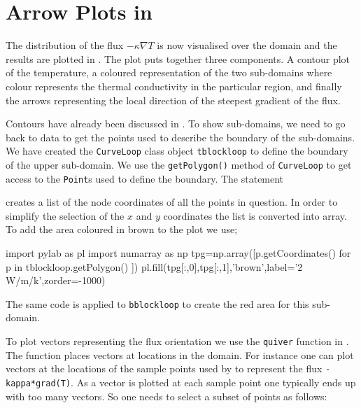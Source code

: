 \section{Arrow Plots in \mpl}
The distribution of the flux $-\kappa \nabla T$ is now visualised over the
domain and the results are plotted in . 
The plot puts together three components. A contour plot of the temperature,
a coloured representation of the two sub-domains where colour represents the
thermal conductivity in the particular region, and finally the arrows
representing the local direction of the steepest gradient of the flux.

Contours have already been discussed in . To show
sub-domains, we need to go back to \pycad data to get the points used to
describe the boundary of the sub-domains. We have created the \verb|CurveLoop|
class object \verb|tblockloop| to define the boundary of the upper sub-domain.
We use the \verb|getPolygon()| method of \verb|CurveLoop| to get
access to the \verb|Point|s used to define the boundary. The statement
\begin{python}
\end{python}
creates a list of the node coordinates of all the points in question. In order 
to simplify the selection of the $x$ and $y$ coordinates the list is converted 
into \modnumpy array. To add the area coloured in brown to the plot we use; 
\begin{python}
import pylab as pl
import numarray as np
tpg=np.array([p.getCoordinates() for p in tblockloop.getPolygon() ])
pl.fill(tpg[:,0],tpg[:,1],'brown',label='2 W/m/k',zorder=-1000)
\end{python}
The same code is applied to \verb|bblockloop| to create the red area for this
sub-domain.

To plot vectors representing the flux orientation we use the 
\verb|quiver| function in \pylab. The function places vectors at locations in
the domain.
For instance one can plot vectors at the locations of the sample points used by
\esc to represent the flux \verb|-kappa*grad(T)|. As a vector is plotted at
each sample point one typically ends up with too many vectors. So one needs to
select a subset of points as follows:

